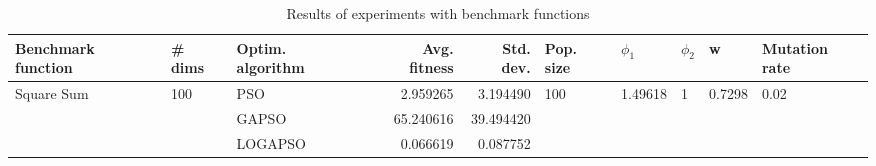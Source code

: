 \begin{table}
\centering
\caption{Results of experiments with benchmark functions}
\begin{tabular}{lllrrlllll}
\toprule
         Benchmark function &              \# dims & Optim. algorithm &  Avg. fitness &  Std. dev. &            Pop. size &               $\phi_{1}$ &         $\phi_{2}$ &                       w &         Mutation rate \\
\midrule
\multirow{3}{*}{Square Sum} & \multirow{3}{*}{100} &              PSO &      2.959265 &   3.194490 & \multirow{3}{*}{100} & \multirow{3}{*}{1.49618} & \multirow{3}{*}{1} & \multirow{3}{*}{0.7298} & \multirow{3}{*}{0.02} \\
                            &                      &            GAPSO &     65.240616 &  39.494420 &                      &                          &                    &                         &                       \\
                            &                      &          LOGAPSO &      0.066619 &   0.087752 &                      &                          &                    &                         &                       \\
\bottomrule
\end{tabular}
\end{table}
